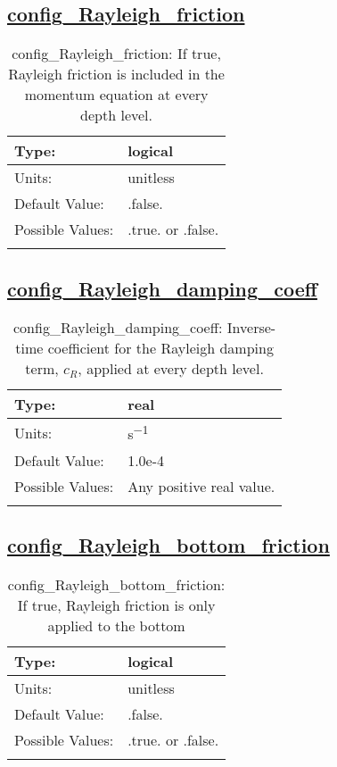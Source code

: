 \subsection[config\_Rayleigh\_friction]{\hyperref[sec:nm_tab_Rayleigh_damping]{config\_Rayleigh\_friction}}
\label{subsec:nm_sec_config_Rayleigh_friction}
\begin{center}
\begin{longtable}{| p{2.0in} || p{4.0in} |}
    \hline
    Type: & logical \\
    \hline
    Units: & \si{unitless} \\
    \hline
    Default Value: & .false. \\
    \hline
    Possible Values: & .true. or .false. \\
    \hline
    \caption{config\_Rayleigh\_friction: If true, Rayleigh friction is included in the momentum equation at every depth level.}
\end{longtable}
\end{center}
\subsection[config\_Rayleigh\_damping\_coeff]{\hyperref[sec:nm_tab_Rayleigh_damping]{config\_Rayleigh\_damping\_coeff}}
\label{subsec:nm_sec_config_Rayleigh_damping_coeff}
\begin{center}
\begin{longtable}{| p{2.0in} || p{4.0in} |}
    \hline
    Type: & real \\
    \hline
    Units: & \si{s^{-1}} \\
    \hline
    Default Value: & 1.0e-4 \\
    \hline
    Possible Values: & Any positive real value. \\
    \hline
    \caption{config\_Rayleigh\_damping\_coeff: Inverse-time coefficient for the Rayleigh damping term, $c_R$, applied at every depth level.}
\end{longtable}
\end{center}
\subsection[config\_Rayleigh\_bottom\_friction]{\hyperref[sec:nm_tab_Rayleigh_damping]{config\_Rayleigh\_bottom\_friction}}
\label{subsec:nm_sec_config_Rayleigh_bottom_friction}
\begin{center}
\begin{longtable}{| p{2.0in} || p{4.0in} |}
    \hline
    Type: & logical \\
    \hline
    Units: & \si{unitless} \\
    \hline
    Default Value: & .false. \\
    \hline
    Possible Values: & .true. or .false. \\
    \hline
    \caption{config\_Rayleigh\_bottom\_friction: If true, Rayleigh friction is only applied to the bottom}
\end{longtable}
\end{center}
